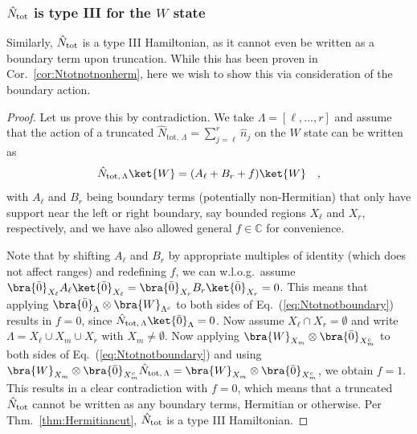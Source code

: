 \documentclass[prx,letterpaper,aps,superscriptaddress,floatfix,twocolumn,nofootinbib]{revtex4-2}
\theoremstyle{definition}
\newcommand{\ktW}{\ket{W}}
\newcommand{\hNtotLambda}{\hat{N}_{\text{tot},\, \Lambda}}
\begin{document}
%
\subsubsection{$\hat{N}_{\rm tot}$ is type III for the $W$ state}
\label{sec:NtottypeIII}
%
Similarly, $\hat{N}_{\rm tot}$ is a type III Hamiltonian, as it cannot even be written as a boundary term upon truncation.
%
While this has been proven in Cor.~\ref{cor:Ntotnotnonherm}, here we wish to show this via consideration of the boundary action.
%
\begin{proof}
    Let us prove this by contradiction.
    We take $\Lambda = [\ell, \dots, r]$ and assume that the action of a truncated $\hNtotLambda = \sum_{j=\ell}^r \hat{n}_j$ on the $W$ state can be written as
    \begin{equation}
        \hNtotLambda \ktW = (A_\ell + B_r + f)\ktW \quad,
    \label{eq:Ntotnotboundary}
    \end{equation}
    with $A_\ell$ and $B_r$ being boundary terms (potentially non-Hermitian) that only have support near the left or right boundary, say bounded regions $X_\ell$ and $X_r$, respectively, and we have also allowed general $f\in\mathbb{C}$ for convenience.

    Note that by shifting $A_\ell$ and $B_r$ by appropriate multiples of identity (which does not affect ranges) and redefining $f$, we can w.l.o.g.\ assume $\bra{\bar{0}}_{X_\ell} A_\ell \ket{\bar{0}}_{X_\ell} = \bra{\bar{0}}_{X_r} B_r \ket{\bar{0}}_{X_r} = 0$.
    This means that applying $\bra{\bar{0}}_{\Lambda} \otimes \bra{W}_{\Lambda^c}$ to  both sides of Eq.~(\ref{eq:Ntotnotboundary}) results in $f = 0$, since $\hNtotLambda \ket{\bar{0}}_{\Lambda} = 0$.
    Now assume $X_\ell \cap X_r = \emptyset$ and write $\Lambda = X_\ell \cup X_m \cup X_r$ with $X_m \neq \emptyset$.
    Now applying $\bra{W}_{X_m} \otimes \bra{\bar{0}}_{X_m^c}$ to both sides of Eq.~(\ref{eq:Ntotnotboundary}) and using $\bra{W}_{X_m} \otimes \bra{\bar{0}}_{X_m^c} \hNtotLambda =  \bra{W}_{X_m} \otimes \bra{\bar{0}}_{X_m^c}$, we obtain $f=1$.
    This results in a clear contradiction with $f=0$, which means that a truncated $\hat{N}_{\rm tot}$ cannot be written as any boundary terms, Hermitian or otherwise.
    Per Thm.~\ref{thm:Hermitiancut}, $\hat{N}_{\rm tot}$ is a type III Hamiltonian.
    \end{proof}
%

%
\end{document}
